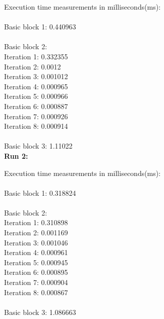 \documentclass[11pt]{article}
\begin{document}
Execution time measurements in milliseconds(ms):\\
\\Basic block 1: 0.440963 \\
\\Basic block 2:\\
\hspace{2em} Iteration 1: 0.332355\\
\hspace{2em} Iteration 2: 0.0012\\
\hspace{2em} Iteration 3: 0.001012\\
\hspace{2em} Iteration 4: 0.000965\\
\hspace{2em} Iteration 5: 0.000966\\
\hspace{2em} Iteration 6: 0.000887\\
\hspace{2em} Iteration 7: 0.000926\\
\hspace{2em} Iteration 8: 0.000914\\
\\Basic block 3: 1.11022\\

\textbf{Run 2:}

Execution time measurements in milliseconds(ms):\\
\\Basic block 1: 0.318824\\
\\Basic block 2:\\
\hspace{2em} Iteration 1: 0.310898\\
\hspace{2em} Iteration 2: 0.001169\\
\hspace{2em} Iteration 3: 0.001046\\
\hspace{2em} Iteration 4: 0.000961\\
\hspace{2em} Iteration 5: 0.000945\\
\hspace{2em} Iteration 6: 0.000895\\
\hspace{2em} Iteration 7: 0.000904\\
\hspace{2em} Iteration 8: 0.000867\\
\\Basic block 3: 1.086663
\end{document}
